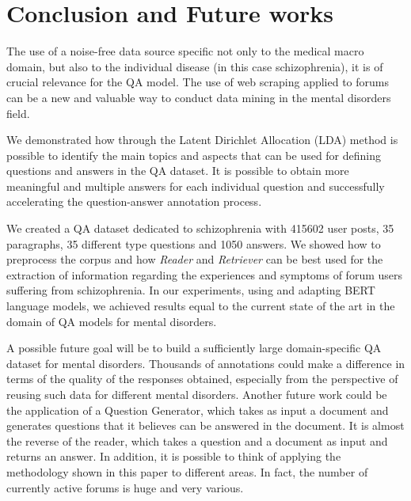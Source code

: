 \documentclass[runningheads]{llncs}
\begin{document}
\section{Conclusion and Future works}\label{sec:conclusion}
The use of a noise-free data source specific not only to the medical macro domain, but also to the individual disease (in this case schizophrenia), it is of crucial relevance for the QA model. The use of web scraping applied to forums can be a new and valuable way to conduct data mining in the mental disorders field.

We demonstrated how through the Latent Dirichlet Allocation (LDA) method is possible to identify the main topics and aspects that can be used for defining questions and answers in the QA dataset. It is possible to obtain more meaningful and multiple answers for each individual question and successfully accelerating the question-answer annotation process.

We created a QA dataset dedicated to schizophrenia with 415602 user posts, 35 paragraphs, 35 different type questions and 1050 answers.
We showed how to preprocess the corpus and how \emph{Reader} and \emph{Retriever} can be best used for the extraction of information regarding the experiences and symptoms of forum users suffering from schizophrenia. In our experiments, using and adapting BERT language models, we achieved results equal to the current state of the art in the domain of QA models for mental disorders.

A possible future goal will be to build a sufficiently large domain-specific QA dataset for mental disorders. Thousands of annotations could make a difference in terms of the quality of the responses obtained, especially from the perspective of reusing such data for different mental disorders.
Another future work could be the application of a Question Generator, which takes as input a document and generates questions that it believes can be answered in the \cite{c41} document. It is almost the reverse of the reader, which takes a question and a document as input and returns an answer.
In addition, it is possible to think of applying the methodology shown in this paper to different areas. In fact, the number of currently active forums is huge and very various.
\end{document}
